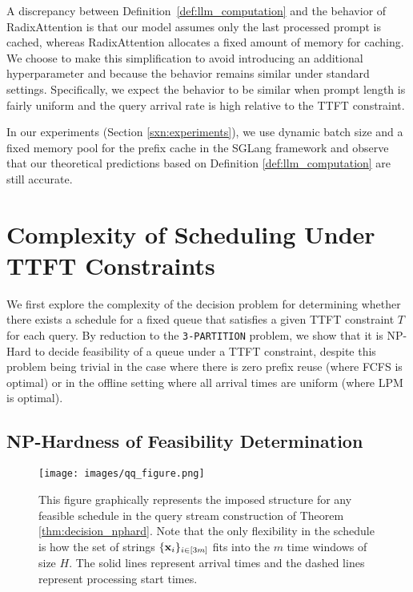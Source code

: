 A discrepancy between Definition~\ref{def:llm_computation} and the behavior of RadixAttention is that our model assumes only the last processed prompt is cached, whereas RadixAttention allocates a fixed amount of memory for caching. We choose to make this simplification to avoid introducing an additional hyperparameter and because the behavior remains similar under standard settings. Specifically, we expect the behavior to be similar when prompt length is fairly uniform and the query arrival rate is high relative to the TTFT constraint.

In our experiments (Section \ref{sxn:experiments}), we use dynamic batch size and a fixed memory pool for the prefix cache in the SGLang framework and observe that our theoretical predictions based on Definition \ref{def:llm_computation} are still accurate.
 

\section{Complexity of Scheduling Under TTFT Constraints}

We first explore the complexity of the decision problem for determining whether there exists a schedule for a fixed queue that satisfies a given TTFT constraint $T$ for each query. By reduction to the \texttt{3-PARTITION} problem, we show that it is NP-Hard to decide feasibility of a queue under a TTFT constraint, despite this problem being trivial in the case where there is zero prefix reuse (where FCFS is optimal) or in the offline setting where all arrival times are uniform (where LPM is optimal).

\subsection{NP-Hardness of Feasibility Determination}

\begin{figure*}
    \centering
    \texttt{[image: images/qq\_figure.png]}
    \caption{This figure graphically represents the imposed structure for any feasible schedule in the query stream construction of Theorem \ref{thm:decision_nphard}. Note that the only flexibility in the schedule is how the set of strings $\{\mathbf{x}_i\}_{i\in[3m]}$ fits into the $m$ time windows of size $H$. The solid lines represent arrival times and the dashed lines represent processing start times.}
    \label{fig:qq_figure}
\end{figure*}

